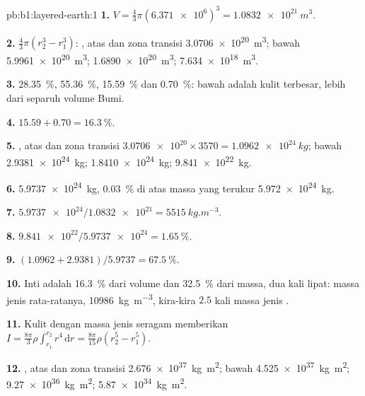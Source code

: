 \begin{solution}{pb:b1:layered-earth:1}
\textbf{1.} $V = \tfrac43\pi(\num{6.371e6})^3 = \qty{1.0832e21}{m^3}$.

\textbf{2.} $\tfrac43\pi(r_2^3 - r_1^3)$: ,  atas dan zona transisi
\qty{3.0706e20}{m^3};  bawah \qty{5.9961e20}{m^3}; 
\qty{1.6890e20}{m^3};  \qty{7.634e18}{m^3}.

\textbf{3.} \qty{28.35}{\percent}, \qty{55.36}{\percent}, \qty{15.59}{\percent}
dan \qty{0.70}{\percent}:  bawah adalah kulit terbesar, lebih dari separuh
volume Bumi.

\textbf{4.} $15.59 + 0.70 = \qty{16.3}{\percent}$.

\textbf{5.} ,  atas dan zona transisi $\num{3.0706e20}\times3570 =
\qty{1.0962e24}{kg}$;  bawah \qty{2.9381e24}{kg}; 
\qty{1.8410e24}{kg};  \qty{9.841e22}{kg}.

\textbf{6.} \qty{5.9737e24}{kg}, \qty{0.03}{\percent} di atas massa yang terukur
\qty{5.972e24}{kg}.

\textbf{7.} $\num{5.9737e24}/\num{1.0832e21} = \qty{5515}{kg.m^{-3}}$.

\textbf{8.} $\num{9.841e22}/\num{5.9737e24} = \qty{1.65}{\percent}$.

\textbf{9.} $(1.0962 + 2.9381)/5.9737 = \qty{67.5}{\percent}$.

\textbf{10.} Inti adalah \qty{16.3}{\percent} dari volume dan
\qty{32.5}{\percent} dari massa, dua kali lipat: massa jenis rata-ratanya,
\qty{10986}{kg.m^{-3}}, kira-kira $2.5$ kali massa jenis .

\textbf{11.} Kulit dengan massa jenis seragam memberikan
$I = \tfrac{8\pi}{3}\rho\int_{r_1}^{r_2} r^4\,\mathrm dr = \tfrac{8\pi}{15}\rho
(r_2^5 - r_1^5)$.

\textbf{12.} ,  atas dan zona transisi \qty{2.676e37}{kg.m^2};  bawah
\qty{4.525e37}{kg.m^2};  \qty{9.27e36}{kg.m^2}; 
\qty{5.87e34}{kg.m^2}.


\end{solution}
